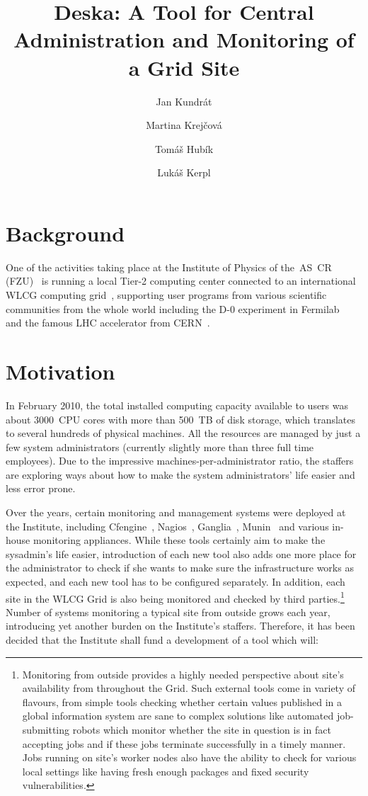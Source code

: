 \documentclass{article}
\begin{document}
\title{Deska: A Tool for Central Administration and Monitoring of a Grid Site}

\author{Jan Kundrát \and Martina Krejčová \and Tomáš Hubík \and Lukáš Kerpl}

\maketitle

\section{Background}

One of the activities taking place at the Institute of Physics of the~AS~CR (FZU)~\cite{fzu} is running a local Tier-2 computing
center connected to an international WLCG computing grid~\cite{wlcg}, supporting user programs from various scientific communities
from the whole world including the D-0 experiment in Fermilab~\cite{d0} and the famous LHC accelerator from CERN~\cite{lhc}.

\section{Motivation}

In February 2010, the total installed computing capacity available to users was about 3000~CPU cores with more than 500~TB of disk
storage, which translates to several hundreds of physical machines.  All the resources are managed by just a few system
administrators (currently slightly more than three full time employees).  Due to the impressive machines-per-administrator ratio,
the staffers are exploring ways about how to make the system administrators' life easier and less error prone.

Over the years, certain monitoring and management systems were deployed at the Institute, including Cfengine~\cite{cfengine},
Nagios~\cite{nagios}, Ganglia~\cite{ganglia}, Munin~\cite{munin} and various in-house monitoring appliances.  While these tools
certainly aim to make the sysadmin's life easier, introduction of each new tool also adds one more place for the administrator to
check if she wants to make sure the infrastructure works as expected, and each new tool has to be configured separately.  In
addition, each site in the WLCG Grid is also being monitored and checked by third parties.\footnote{Monitoring from outside
provides a highly needed perspective about site's availability from throughout the Grid.  Such external tools come in variety of
flavours, from simple tools checking whether certain values published in a global information system are sane to complex solutions
like automated job-submitting robots which monitor whether the site in question is in fact accepting jobs and if these jobs
terminate successfully in a timely manner.  Jobs running on site's worker nodes also have the ability to check for various local
settings like having fresh enough packages and fixed security vulnerabilities.}  Number of systems monitoring a typical site from
outside grows each year, introducing yet another burden on the Institute's staffers.  Therefore, it has been decided that the
Institute shall fund a development of a tool which will:
\end{document}
